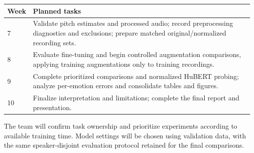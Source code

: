 \begin{center}
\begin{tabular}{lp{11.5cm}}
\toprule
\textbf{Week} & \textbf{Planned tasks} \\
\midrule
7 & Validate pitch estimates and processed audio; record preprocessing diagnostics and exclusions; prepare matched original/normalized recording sets. \\
8 & Evaluate fine-tuning and begin controlled augmentation comparisons, applying training augmentations only to training recordings. \\
9 & Complete prioritized comparisons and normalized HuBERT probing; analyze per-emotion errors and consolidate tables and figures. \\
10 & Finalize interpretation and limitations; complete the final report and presentation. \\
\bottomrule
\end{tabular}
\end{center}

The team will confirm task ownership and prioritize experiments according to available training time. Model settings will be chosen using validation data, with the same speaker-disjoint evaluation protocol retained for the final comparisons.
